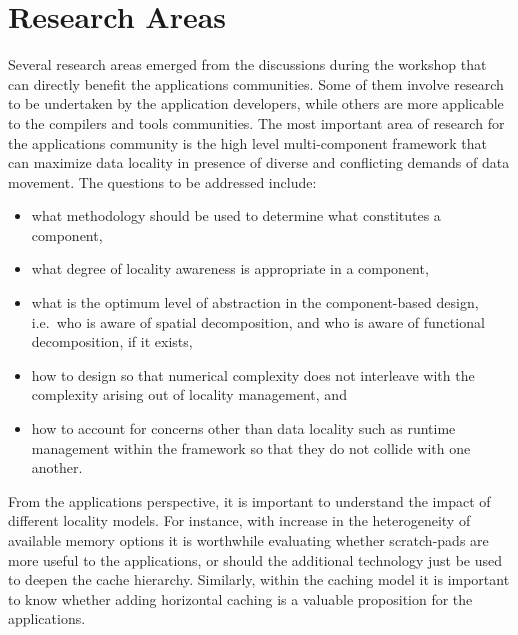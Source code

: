 \section{Research Areas}

Several research areas emerged from the discussions during the
workshop that can directly benefit the applications communities. Some
of them involve research to be undertaken by the application
developers, while others are more applicable to the compilers and
tools communities. The most important area of research for the
applications community is the high level multi-component framework
that can maximize data locality in presence of diverse and conflicting
demands of data movement. The questions to be addressed include:
\begin{itemize}
\item what methodology should be used to determine what constitutes a
component,
\item what degree of locality awareness is appropriate in a
component,
\item what is the optimum level of abstraction in the component-based
design, i.e.\ who is aware of spatial decomposition, and who is
aware of functional decomposition, if it exists,
\item how to design so that
numerical complexity does not interleave with the complexity arising
out of locality management, and
\item how to account for concerns other
than data locality such as runtime management within the framework so
that they do not collide with one another. 
\end{itemize}

From the applications perspective, it is important to understand the
impact of different locality models. For instance, with increase in
the heterogeneity of available memory options it is worthwhile
evaluating whether scratch-pads are more useful to the applications,
or should the additional technology just be used to deepen the cache
hierarchy. Similarly, within the caching model it is important to know
whether adding horizontal caching is a valuable proposition for the
applications.




